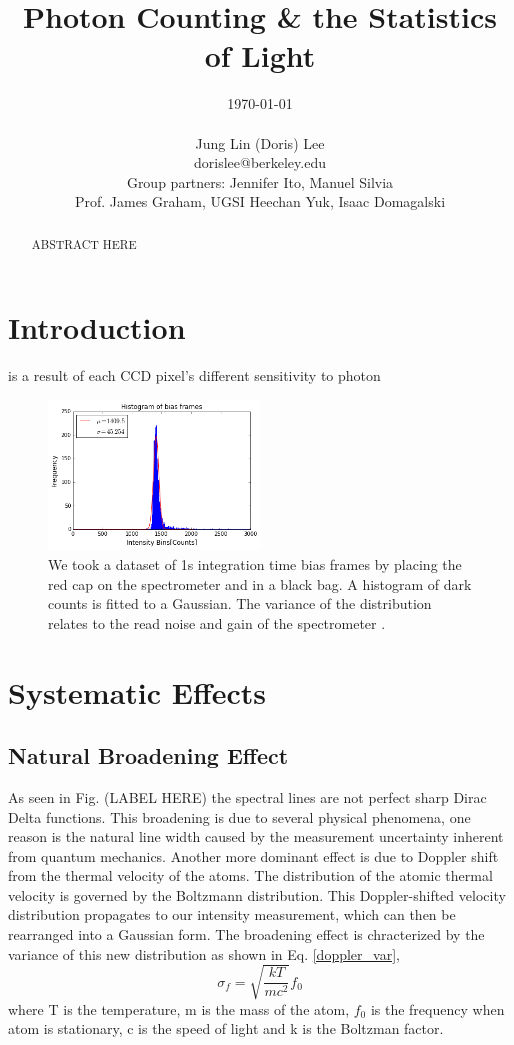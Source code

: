 \documentclass[authoryear, 12pt,5p, times]{elsarticle}
\begin{document}
\begin{frontmatter}
\title{Photon Counting \& the Statistics of Light}
\author{\today \\ \quad \\Jung Lin (Doris) Lee\\ dorislee@berkeley.edu\\Group partners: Jennifer Ito, Manuel Silvia\\Prof. James Graham, UGSI Heechan Yuk, Isaac Domagalski}
	\begin{abstract}
	ABSTRACT HERE
	\end{abstract}
\end{frontmatter}
\section{Introduction\label{intro}}
is a result of each CCD pixel's different sensitivity to photon
\begin{figure}
\includegraphics[width=0.5\textwidth]{figures/bias_histo}
\caption{We took a dataset of 1s integration time bias frames by placing the red cap on the spectrometer and in a black bag. A histogram of dark counts is fitted to a Gaussian. The variance of the distribution relates to the read noise and gain of the spectrometer \citep{ccd_handbook}.}
\end{figure}
\section{Systematic Effects}
 \subsection{Natural Broadening Effect}
 As seen in Fig. (LABEL HERE) the spectral lines are not perfect sharp Dirac Delta functions. This broadening is due to several physical phenomena, one reason is the natural line width caused by the measurement uncertainty inherent from quantum mechanics. Another more dominant effect is due to Doppler shift from the thermal velocity of the atoms. The distribution of the atomic thermal velocity is governed by the Boltzmann distribution. This Doppler-shifted velocity distribution propagates to our intensity measurement, which can then be rearranged into a Gaussian form. The broadening effect is chracterized by the variance of this new distribution as shown in  Eq. \ref{doppler_var},
 \begin{equation}\label{doppler_var}
\sigma_f = \sqrt{\frac{kT}{mc^2}}f_0
 \end{equation}
 where T is the temperature, m is the mass of the atom, $f_0$ is the frequency when atom is stationary, c is the speed of light and k is the Boltzman factor.
\end{document}
